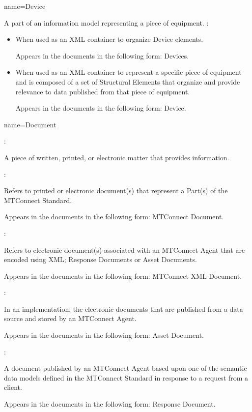 {
  name={Device}
}
{
	A part of an information model representing a piece of equipment.  
	:

    \begin{itemize}
	\item When used as an XML container to organize Device elements.

	Appears in the documents in the following form: Devices.

	\item When used as an XML container to represent a specific piece of equipment and is composed of a set of Structural Elements that organize and provide relevance to data published from that piece of equipment.

	Appears in the documents in the following form: Device.
	\end{itemize}
}


{
  name={Document}
}
{
	:

	A piece of written, printed, or electronic matter that provides information.

	:

	Refers to printed or electronic document(s) that represent a Part(s) of the MTConnect Standard.

	Appears in the documents in the following form: MTConnect Document.

	:

	Refers to electronic document(s) associated with an MTConnect Agent that are encoded using XML; Response Documents or Asset Documents.

	Appears in the documents in the following form: MTConnect XML Document.

	:

	In an implementation, the electronic documents that are published from a data source and stored by an MTConnect Agent.

	Appears in the documents in the following form: Asset Document.

	:

	A document published by an MTConnect Agent based upon one of the semantic data models defined in the MTConnect Standard in response to a request from a client.  

	Appears in the documents in the following form: Response Document.
}


